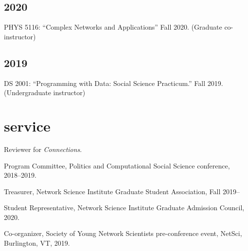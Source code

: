 \documentclass[11pt, letter]{article}
\begin{document}
\subsection{2020}
PHYS 5116: ``Complex Networks and Applications'' Fall 2020. (Graduate
co-instructor)

\subsection{2019}
DS 2001: ``Programming with Data: Social Science Practicum.'' Fall 2019.
(Undergraduate instructor) \vspace{2mm}


 \section{service}
 Reviewer for \textit{Connections}.

 Program Committee, Politics and Computational Social Science conference,
 2018--2019.

 Treasurer, Network Science Institute Graduate Student Association, Fall 2019--

 Student Representative, Network Science Institute Graduate Admission Council,
 2020.

 Co-organizer, Society of Young Network Scientists pre-conference event, NetSci,
 Burlington, VT, 2019.
\end{document}
